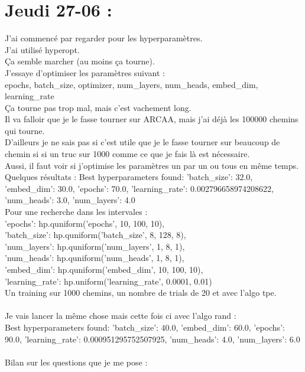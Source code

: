 \documentclass{article}
\begin{document}
\section*{Jeudi 27-06 :}
J'ai commencé par regarder pour les hyperparamètres.\\
J'ai utilisé hyperopt.\\
Ça semble marcher (au moins ça tourne).\\
J'essaye d'optimiser les paramètres suivant :\\
epochs, batch\_size, optimizer, num\_layers, num\_heads, embed\_dim, learning\_rate\\
Ça tourne pas trop mal, mais c'est vachement long.\\
Il va falloir que je le fasse tourner sur ARCAA, mais j'ai déjà les 100000 chemins qui tourne.\\
D'ailleurs je ne sais pas si c'est utile que je le fasse tourner sur beaucoup de chemin si si un truc sur 1000 comme ce que je fais là est nécessaire.\\
Aussi, il faut voir si j'optimise les paramètres un par un ou tous en même temps.\\
Quelques résultats :
Best hyperparameters found: 'batch\_size': 32.0, 'embed\_dim': 30.0, 'epochs': 70.0, 'learning\_rate': 0.002796658974208622, 'num\_heads': 3.0, 'num\_layers': 4.0\\
Pour une recherche dans les intervales :\\
'epochs': hp.quniform('epochs', 10, 100, 10),\\
'batch\_size': hp.quniform('batch\_size', 8, 128, 8),\\
'num\_layers': hp.quniform('num\_layers', 1, 8, 1),\\
'num\_heads': hp.quniform('num\_heads', 1, 8, 1),\\
'embed\_dim': hp.quniform('embed\_dim', 10, 100, 10),\\
'learning\_rate': hp.uniform('learning\_rate', 0.0001, 0.01)\\
Un training sur 1000 chemins, un nombre de trials de 20 et avec l'algo tpe.\\
\\
Je vais lancer la même chose mais cette fois ci avec l'algo rand :\\
Best hyperparameters found: 'batch\_size': 40.0, 'embed\_dim': 60.0, 'epochs': 90.0, 'learning\_rate': 0.000951295752507925, 'num\_heads': 4.0, 'num\_layers': 6.0\\
\\
Bilan sur les questions que je me pose :\\
\end{document}
